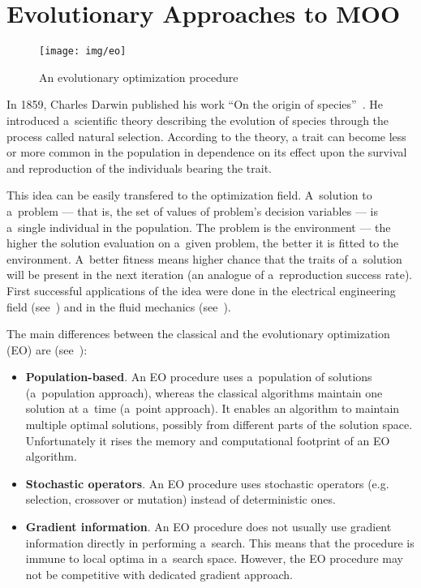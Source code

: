 \section{Evolutionary Approaches to MOO}
\label{sec_ea_in_moo}

\begin{figure}
  \centering \texttt{[image: img/eo]}
  \caption{An evolutionary optimization procedure}
  \label{eo}
\end{figure}

In 1859, Charles Darwin published his work ``On the origin of
species''~\cite{Dar1859}. He introduced a~scientific theory describing the
evolution of species through the process called natural selection.  According
to the theory, a trait can become less or more common in the population in
dependence on its effect upon the survival and reproduction of the individuals
bearing the trait.

This idea can be easily transfered to the optimization field. A~solution to
a~problem --- that is, the set of values of problem's decision variables ---
is a~single individual in the population. The problem is the environment ---
the higher the solution evaluation on a~given problem, the better it is fitted
to the environment. A~better fitness means higher chance that the traits of
a~solution will be present in the next iteration (an analogue of
a~reproduction success rate). First successful applications of the idea were
done in the electrical engineering field (see~\cite{Fog64}) and in the fluid
mechanics (see~\cite{Rec65, Sch65}).

The main differences between the classical and the evolutionary optimization
(EO) are (see~\cite{Deb08}):

\begin{itemize}
\item \textbf{Population-based}. An EO procedure uses a~population of
  solutions (a~population approach), whereas the classical algorithms maintain
  one solution at a~time (a~point approach). It enables an algorithm to
  maintain multiple optimal solutions, possibly from different parts of the
  solution space. Unfortunately it rises the memory and computational
  footprint of an EO algorithm.
\item \textbf{Stochastic operators}. An EO procedure uses stochastic operators
  (e.g. selection, crossover or mutation) instead of deterministic ones.
\item \textbf{Gradient information}. An EO procedure does not usually use
  gradient information directly in performing a~search. This means that the
  procedure is immune to local optima in a~search space. However, the EO
  procedure may not be competitive with dedicated gradient approach.
\end{itemize}

